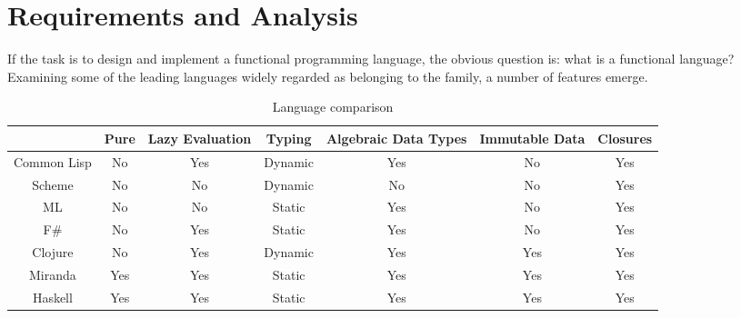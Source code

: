 \documentclass[12pt, a4paper]{report}
\begin{document}
\chapter{Requirements and Analysis}

If the task is to design and implement a functional programming language, the obvious question is:
what is a functional language? Examining some of the leading languages widely regarded as belonging
to the family, a number of features emerge.

\begin{table}
    \resizebox{\textwidth}{!}
    {\begin{tabular}{|c|cccccc|}
        \hline
                    & Pure                    & Lazy Evaluation     & Typing                      & Algebraic Data Types     & Immutable Data          & Closures \\
        \hline
        Common Lisp & No                      & \cellcolor{LRed}Yes & Dynamic                     & \cellcolor{GoldenRod}Yes & No                      & \cellcolor{LRed}Yes \\
        Scheme      & No                      & No                  & Dynamic                     & No                       & No                      & \cellcolor{LRed}Yes \\
        ML          & No                      & No                  & \cellcolor{Lawngreen}Static & \cellcolor{GoldenRod}Yes & No                      & \cellcolor{LRed}Yes \\
        F\#         & No                      & \cellcolor{LRed}Yes & \cellcolor{Lawngreen}Static & \cellcolor{GoldenRod}Yes & No                      & \cellcolor{LRed}Yes \\
        Clojure     & No                      & \cellcolor{LRed}Yes & Dynamic                     & \cellcolor{GoldenRod}Yes & \cellcolor{Seagreen}Yes & \cellcolor{LRed}Yes \\
        Miranda     & \cellcolor{Seagreen}Yes & \cellcolor{LRed}Yes & \cellcolor{Lawngreen}Static & \cellcolor{GoldenRod}Yes & \cellcolor{Seagreen}Yes & \cellcolor{LRed}Yes \\
        Haskell     & \cellcolor{Seagreen}Yes & \cellcolor{LRed}Yes & \cellcolor{Lawngreen}Static & \cellcolor{GoldenRod}Yes & \cellcolor{Seagreen}Yes & \cellcolor{LRed}Yes \\
        \hline
    \end{tabular}}
    \caption{Language comparison}
    \label{tabel:langs}
\end{table}
\end{document}
